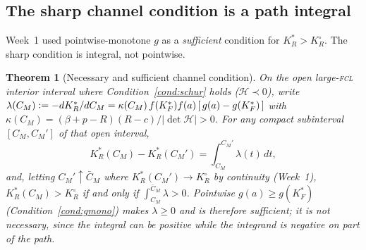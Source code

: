\documentclass[11pt,reqno]{amsart}
\theoremstyle{plain}
\newtheorem{theorem}{Theorem}
\theoremstyle{definition}
\theoremstyle{remark}
\newcommand{\KRs}{K_R^{*}}
\newcommand{\KFs}{K_F^{*}}
\newcommand{\KRo}{K_R^{\circ}}
\newcommand{\CM}{C_M}
\newcommand{\CMbar}{\bar C_M}
\newcommand{\bp}{\beta+p}
\newcommand{\eqdef}{\vcentcolon=}
\newcommand{\Hcal}{\mathcal H}
\begin{document}
\subsection{The sharp channel condition is a path integral}

Week~1 used pointwise-monotone $g$ as a \emph{sufficient} condition for
$\KRs>\KRo$. The sharp condition is integral, not pointwise.

\begin{theorem}[Necessary and sufficient channel condition]\label{thm:sharp}
On the open large-\textsc{fcl} interior interval where Condition~\ref{cond:schur}
holds ($\Hcal\prec0$), write
$\lambda(\CM)\eqdef-d\KRs/d\CM=\kappa(\CM)\,f(\KFs)f(a)\,[\,g(a)-g(\KFs)\,]$ with
$\kappa(\CM)=(\bp-R)(R-c)/|\det\Hcal|>0$. For any compact subinterval
$[\CM,\CM']$ of that open interval,
\begin{equation}\label{eq:ftc}
  \KRs(\CM)-\KRs(\CM')=\int_{\CM}^{\CM'}\lambda(t)\,dt ,
\end{equation}
and, letting $\CM'\uparrow\CMbar$ where $\KRs(\CM')\to\KRo$ by continuity (Week~1),
$\KRs(\CM)>\KRo$ \emph{if and only if} $\int_{\CM}^{\CMbar}\lambda>0$.
Pointwise $g(a)\ge g(\KFs)$ (Condition~\ref{cond:gmono}) makes $\lambda\ge0$ and is
therefore \emph{sufficient}; it is \emph{not necessary}, since the integral can be
positive while the integrand is negative on part of the path.
\end{theorem}
\end{document}
